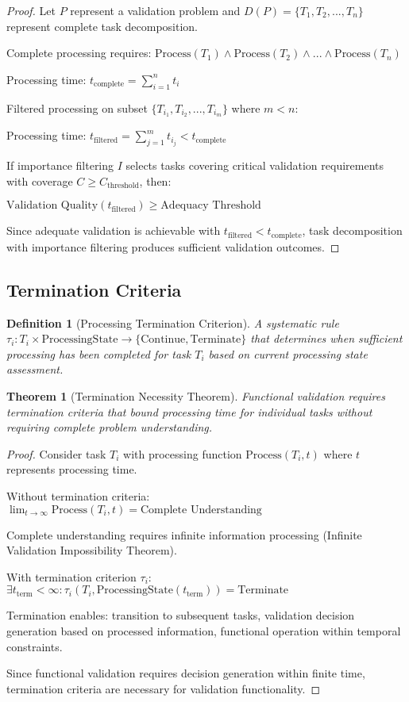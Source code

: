 \documentclass[12pt,a4paper]{article}
\newtheorem{theorem}{Theorem}
\newtheorem{definition}{Definition}
\begin{document}
\begin{proof}
Let $P$ represent a validation problem and $D(P) = \{T_1, T_2, ..., T_n\}$ represent complete task decomposition.

Complete processing requires: $\text{Process}(T_1) \land \text{Process}(T_2) \land ... \land \text{Process}(T_n)$

Processing time: $t_{\text{complete}} = \sum_{i=1}^{n} t_i$

Filtered processing on subset $\{T_{i_1}, T_{i_2}, ..., T_{i_m}\}$ where $m < n$:

Processing time: $t_{\text{filtered}} = \sum_{j=1}^{m} t_{i_j} < t_{\text{complete}}$

If importance filtering $I$ selects tasks covering critical validation requirements with coverage $C \geq C_{\text{threshold}}$, then:

$\text{Validation Quality}(t_{\text{filtered}}) \geq \text{Adequacy Threshold}$

Since adequate validation is achievable with $t_{\text{filtered}} < t_{\text{complete}}$, task decomposition with importance filtering produces sufficient validation outcomes.
\end{proof}

\subsection{Termination Criteria}

\begin{definition}[Processing Termination Criterion]
A systematic rule $\tau_i: T_i \times \text{ProcessingState} \to \{\text{Continue}, \text{Terminate}\}$ that determines when sufficient processing has been completed for task $T_i$ based on current processing state assessment.
\end{definition}

\begin{theorem}[Termination Necessity Theorem]
Functional validation requires termination criteria that bound processing time for individual tasks without requiring complete problem understanding.
\end{theorem}

\begin{proof}
Consider task $T_i$ with processing function $\text{Process}(T_i, t)$ where $t$ represents processing time.

Without termination criteria: $\lim_{t \to \infty} \text{Process}(T_i, t) = \text{Complete Understanding}$

Complete understanding requires infinite information processing (Infinite Validation Impossibility Theorem).

With termination criterion $\tau_i$: $\exists t_{\text{term}} < \infty : \tau_i(T_i, \text{ProcessingState}(t_{\text{term}})) = \text{Terminate}$

Termination enables: transition to subsequent tasks, validation decision generation based on processed information, functional operation within temporal constraints.

Since functional validation requires decision generation within finite time, termination criteria are necessary for validation functionality.
\end{proof}
\end{document}
